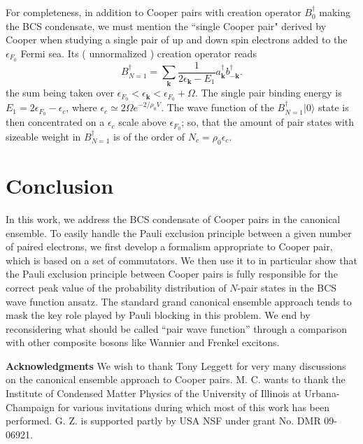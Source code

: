 \documentclass[twocolumn,showpacs]{revtex4}
\def\v#1{\mathbf{#1}}
\begin{document}
  For completeness, in addition to Cooper pairs with creation operator $B_0^\dag$ making the BCS condensate, we must mention the ``single Cooper pair" derived by Cooper when studying a single pair of up and down spin electrons added to the $\epsilon_{F_0}$ Fermi sea. Its ( unnormalized ) creation operator reads 
  \begin{equation}
B_{N=1}^\dag=\sum_{\v k}\frac{1}{2\epsilon_{\v k}-E_1}a_{\v k}^\dag b_{-\v k}^\dag.
\end{equation}
the sum being taken over $\epsilon_{F_0}<\epsilon_{\v{k}}<\epsilon_{F_0}+\Omega$. The single pair binding energy is $E_1=2\epsilon_{F_0}-\epsilon_{c}$, where $\epsilon_{c}\simeq2\Omega e^{-2/\rho_0V}$. The wave function of the $B_{N=1}^\dag|0\rangle$ state is then concentrated on a $\epsilon_{c}$ scale above $\epsilon_{F_0}$; so, that the amount of pair states with sizeable weight in $B_{N=1}^\dag$ is of the order of $N_c=\rho_0\epsilon_{c}$.
 
  
  \section{Conclusion}
 
 
In this work, we address the BCS condensate of Cooper pairs in the canonical ensemble. To easily handle the Pauli exclusion principle between a given number of paired electrons, we first develop a formalism appropriate to Cooper pair, which is based on a set of commutators.  We then use it to in particular show that the Pauli exclusion principle between Cooper pairs is fully responsible for the correct peak value of the probability distribution of $N$-pair states in the BCS wave function ansatz. The standard grand canonical ensemble approach  tends to mask the key role played by Pauli blocking in this problem. We end by reconsidering what should be called ``pair wave function'' through a comparison with other composite bosons like Wannier and Frenkel excitons. 

\textbf{Acknowledgments}
We wish to thank Tony Leggett for very many discussions on the canonical ensemble approach to Cooper pairs. M. C. wants to thank the Institute of Condensed Matter Physics of the University of Illinois at Urbana-Champaign for various invitations during which most of this work has been performed.  G. Z. is supported partly by USA NSF under grant No. DMR 09-06921. 
\end{document}
